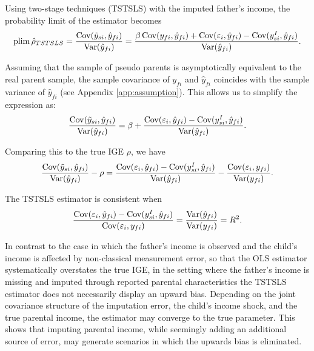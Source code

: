 Using two-stage techniques (TSTSLS) with the imputed father’s income, the probability limit of the estimator becomes
\[
\operatorname*{plim} \hat{\rho}_{TSTSLS} = \frac{\operatorname{Cov}(\tilde y_{si}, \hat{y}_{fi})}{\operatorname{Var}(\hat{y}_{fi})} = \frac{\beta \operatorname{Cov}(y_{fi}, \hat{y}_{fi}) + \operatorname{Cov}(\varepsilon_i, \hat{y}_{fi}) - \operatorname{Cov}(y_{si}^I, \hat{y}_{fi})}{\operatorname{Var}(\hat{y}_{fi})}.
\]

Assuming that the sample of pseudo parents is asymptotically equivalent to the real parent sample, the sample covariance of $y_{fi}$ and $\hat{y}_{fi}$ coincides with the sample variance of $\hat{y}_{fi}$ (see Appendix \ref{app:assumption}). This allows us to simplify the expression as:
\[
\frac{\operatorname{Cov}(\tilde y_{si}, \hat{y}_{fi})}{\operatorname{Var}(\hat{y}_{fi})} = \beta + \frac{\operatorname{Cov}(\varepsilon_i, \hat{y}_{fi}) - \operatorname{Cov}(y_{si}^I, \hat{y}_{fi})}{\operatorname{Var}(\hat{y}_{fi})}.
\]


Comparing this to the true IGE $\rho$, we have
\[
\frac{\operatorname{Cov}(\tilde y_{si}, \hat{y}_{fi})}{\operatorname{Var}(\hat{y}_{fi})} - \rho = \frac{\operatorname{Cov}(\varepsilon_i, \hat{y}_{fi}) - \operatorname{Cov}(y_{si}^I, \hat{y}_{fi})}{\operatorname{Var}(\hat{y}_{fi})} - \frac{\operatorname{Cov}(\varepsilon_i, y_{fi})}{\operatorname{Var}(y_{fi})}.
\]

The TSTSLS estimator is consistent when
\[
\frac{\operatorname{Cov}(\varepsilon_i, \hat{y}_{fi}) - \operatorname{Cov}(y_{si}^I, \hat{y}_{fi})}{\operatorname{Cov}(\varepsilon_i, y_{fi})} = \frac{\operatorname{Var}(\hat{y}_{fi})}{\operatorname{Var}(y_{fi})} = R^2.
\]

In contrast to the case in which the father’s income is observed and the child’s income is affected by non-classical measurement error, so that the OLS estimator systematically overstates the true IGE, in the setting where the father’s income is missing and imputed through reported parental characteristics the TSTSLS estimator does not necessarily display an upward bias. Depending on the joint covariance structure of the imputation error, the child’s income shock, and the true parental income, the estimator may converge to the true parameter. This shows that imputing parental income, while seemingly adding an additional source of error, may generate scenarios in which the upwards bias is eliminated.






